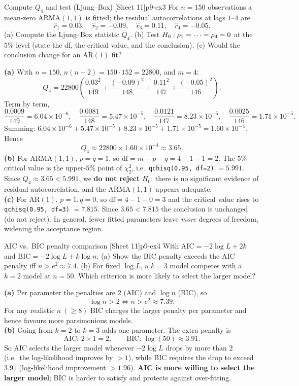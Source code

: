 \begin{exercise}{Compute $Q_4$ and test (Ljung--Box) \quad\textnormal{[Sheet 11]}}{p9-ex3}
For $n=150$ observations a mean-zero ARMA$(1,1)$ is fitted; the residual
autocorrelations at lags $1$--$4$ are
\[
\hat r_1=0.03,\quad \hat r_2=-0.09,\quad \hat r_3=0.11,\quad \hat r_4=-0.05 .
\]
(a) Compute the Ljung--Box statistic $Q_4$.
(b) Test $H_0:\rho_1=\cdots=\rho_4=0$ at the $5\%$ level (state the df, the
critical value, and the conclusion).
(c) Would the conclusion change for an AR$(1)$ fit?
\end{exercise}
\begin{solution}
\textbf{(a)} With $n=150$, $n(n+2)=150\cdot152=22800$, and $m=4$:
\[
Q_4 = 22800\left(\frac{0.03^2}{149}+\frac{(-0.09)^2}{148}
+\frac{0.11^2}{147}+\frac{(-0.05)^2}{146}\right).
\]
Term by term,
\[
\frac{0.0009}{149}=6.04\times10^{-6},\quad
\frac{0.0081}{148}=5.47\times10^{-5},\quad
\frac{0.0121}{147}=8.23\times10^{-5},\quad
\frac{0.0025}{146}=1.71\times10^{-5}.
\]
Summing: $6.04\times10^{-6}+5.47\times10^{-5}+8.23\times10^{-5}+1.71\times10^{-5}
=1.60\times10^{-4}$. Hence
\[
Q_4 \approx 22800\times 1.60\times10^{-4} \approx 3.65 .
\]
\textbf{(b)} For ARMA$(1,1)$, $p=q=1$, so $\mathrm{df}=m-p-q=4-1-1=2$. The $5\%$
critical value is the upper-$5\%$ point of $\chi^2_2$, i.e.\
\texttt{qchisq(0.95, df=2)} $=5.991$. Since $Q_4\approx3.65<5.991$, we
\textbf{do not reject} $H_0$: there is no significant evidence of residual
autocorrelation, and the ARMA$(1,1)$ appears adequate.\\
\textbf{(c)} For AR$(1)$, $p=1,q=0$, so $\mathrm{df}=4-1-0=3$ and the critical
value rises to \texttt{qchisq(0.95, df=3)} $=7.815$. Since $3.65<7.815$ the
conclusion is unchanged (do not reject). In general, fewer fitted parameters
leave \emph{more} degrees of freedom, widening the acceptance region.
\end{solution}

\begin{exercise}{AIC vs.\ BIC penalty comparison \quad\textnormal{[Sheet 11]}}{p9-ex4}
With $\mathrm{AIC}=-2\log L+2k$ and $\mathrm{BIC}=-2\log L+k\log n$:
(a) Show the BIC penalty exceeds the AIC penalty iff $n>e^2\approx7.4$.
(b) For fixed $\log L$, a $k=3$ model competes with a $k=2$ model at $n=50$.
Which criterion is more likely to select the larger model?
\end{exercise}
\begin{solution}
\textbf{(a)} Per parameter the penalties are $2$ (AIC) and $\log n$ (BIC), so
\[
\log n > 2 \iff n > e^2 \approx 7.39 .
\]
For any realistic $n\ (\ge 8)$ BIC charges the larger penalty per parameter and
hence favours more parsimonious models.\\
\textbf{(b)} Going from $k=2$ to $k=3$ adds one parameter. The extra penalty is
\[
\text{AIC: } 2\times1=2,\qquad
\text{BIC: } \log(50)\approx 3.91 .
\]
So AIC selects the larger model whenever $-2\log L$ drops by more than $2$ (i.e.\
the log-likelihood improves by $>1$), while BIC requires the drop to exceed
$3.91$ (log-likelihood improvement $>1.96$). \textbf{AIC is more willing to
select the larger model}; BIC is harder to satisfy and protects against
over-fitting.
\end{solution}

